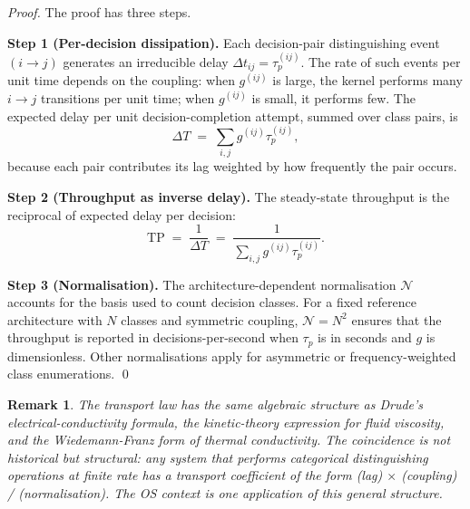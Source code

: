 \documentclass[twocolumn,11pt,a4paper]{article}
\newtheorem{remark}[theorem]{Remark}
\newcommand{\TP}{\mathrm{TP}}
\newcommand{\taup}{\tau_p}
\newcommand{\Norm}{\mathcal{N}}
\begin{document}
\begin{proof}
The proof has three steps.

\textbf{Step 1 (Per-decision dissipation).} Each decision-pair distinguishing event $(i \to j)$ generates an irreducible delay $\Delta t_{ij} = \taup^{(ij)}$. The rate of such events per unit time depends on the coupling: when $g^{(ij)}$ is large, the kernel performs many $i \to j$ transitions per unit time; when $g^{(ij)}$ is small, it performs few. The expected delay per unit decision-completion attempt, summed over class pairs, is
\[
\Delta T \;=\; \sum_{i,j} g^{(ij)}\taup^{(ij)},
\]
because each pair contributes its lag weighted by how frequently the pair occurs.

\textbf{Step 2 (Throughput as inverse delay).} The steady-state throughput is the reciprocal of expected delay per decision:
\[
\TP \;=\; \frac{1}{\Delta T} \;=\; \frac{1}{\sum_{i,j} g^{(ij)}\taup^{(ij)}}.
\]

\textbf{Step 3 (Normalisation).} The architecture-dependent normalisation $\Norm$ accounts for the basis used to count decision classes. For a fixed reference architecture with $N$ classes and symmetric coupling, $\Norm = N^2$ ensures that the throughput is reported in decisions-per-second when $\taup$ is in seconds and $g$ is dimensionless. Other normalisations apply for asymmetric or frequency-weighted class enumerations.
\qed
\end{proof}

\begin{remark}
\label{rem:utl-form}
The transport law has the same algebraic structure as Drude's electrical-conductivity formula, the kinetic-theory expression for fluid viscosity, and the Wiedemann-Franz form of thermal conductivity. The coincidence is not historical but structural: any system that performs categorical distinguishing operations at finite rate has a transport coefficient of the form (lag) $\times$ (coupling) / (normalisation). The OS context is one application of this general structure.
\end{remark}
\end{document}
